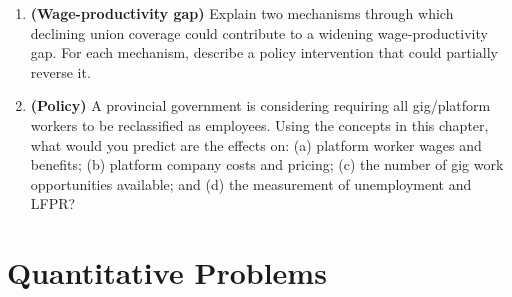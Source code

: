 \begin{enumerate}
\item \textbf{(Wage-productivity gap)} Explain two mechanisms through
which declining union coverage could contribute to a widening
wage-productivity gap. For each mechanism, describe a policy intervention
that could partially reverse it.

\item \textbf{(Policy)} A provincial government is considering requiring
all gig/platform workers to be reclassified as employees. Using the
concepts in this chapter, what would you predict are the effects on:
(a) platform worker wages and benefits; (b) platform company costs and
pricing; (c) the number of gig work opportunities available; and (d) the
measurement of unemployment and LFPR?

\end{enumerate}

\section*{Quantitative Problems}

